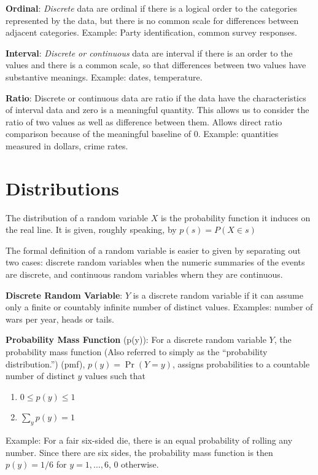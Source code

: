 \documentclass[]{book}
\providecommand{\tightlist}{%
  \setlength{\itemsep}{0pt}\setlength{\parskip}{0pt}}
\theoremstyle{definition}
\theoremstyle{definition}
\theoremstyle{definition}
\theoremstyle{remark}
\begin{document}
\textbf{Ordinal}: \textit{Discrete} data are ordinal if there is a
logical order to the categories represented by the data, but there is no
common scale for differences between adjacent categories. Example: Party
identification, common survey responses.

\textbf{Interval}: \textit{Discrete or continuous} data are interval if
there is an order to the values and there is a common scale, so that
differences between two values have substantive meanings. Example:
dates, temperature.

\textbf{Ratio}: Discrete or continuous data are ratio if the data have
the characteristics of interval data and zero is a meaningful quantity.
This allows us to consider the ratio of two values as well as difference
between them. Allows direct ratio comparison because of the meaningful
baseline of 0. Example: quantities measured in dollars, crime rates.

\section{Distributions}\label{distributions}

The distribution of a random variable \(X\) is the probability function
it induces on the real line. It is given, roughly speaking, by
\(p(s) = P(X \in s)\)

The formal definition of a random variable is easier to given by
separating out two cases: discrete random variables when the numeric
summaries of the events are discrete, and continuous random variables
whern they are continuous.

\textbf{Discrete Random Variable}: \(Y\) is a discrete random variable
if it can assume only a finite or countably infinite number of distinct
values. Examples: number of wars per year, heads or tails.

\textbf{Probability Mass Function} (p(y)): For a discrete random
variable \(Y\), the probability mass function (Also referred to simply
as the ``probability distribution.'') (pmf), \(p(y)=\Pr(Y=y)\), assigns
probabilities to a countable number of distinct \(y\) values such that

\begin{enumerate}
\def\labelenumi{\arabic{enumi}.}
\tightlist
\item
  \(0\le p(y)\le 1\)
\item
  \(\sum\limits_y p(y)=1\)
\end{enumerate}

\parbox[t]{5in}{Example: For a fair six-sided die, there is an equal probability of rolling any number.  Since there are six sides, the probability mass function is then $p(y)=1/6$ for $y=1,\ldots,6$, 0 otherwise.}
\end{document}

